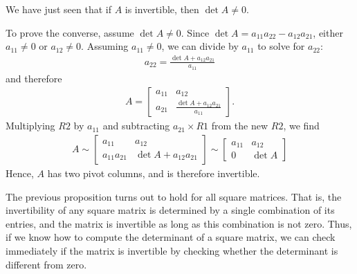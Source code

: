 \documentclass[12pt,letterpaper,reqno]{article}
\numberwithin{equation}{section}
\begin{document}
\begin{pf}
We have just seen that if $A$ is invertible, then $\det A \neq 0$. 

To prove the converse, assume $\det A \neq 0$. Since $\det A=a_{11}a_{22}-a_{12}a_{21}$, either $a_{11} \neq 0$ or $a_{12} \neq 0$. Assuming $a_{11} \neq 0$, we can divide by $a_{11}$ to solve for $a_{22}$:
\begin{align*}
	a_{22}=\frac{\det A+a_{12}a_{21}}{a_{11}}
\end{align*} 
	and therefore
	\begin{align*}
		A=\begin{bmatrix}
			a_{11} & a_{12} \\
			a_{21} & \frac{\det A+a_{12}a_{21}}{a_{11}}
		\end{bmatrix}.
	\end{align*}
Multiplying $R2$ by $a_{11}$ and subtracting $a_{21} \times R1$ from the new $R2$, we find
\begin{align*}
	A \sim \begin{bmatrix}
		a_{11} & a_{12} \\
		a_{11}a_{21} & \det A + a_{12}a_{21}
	\end{bmatrix} \sim \begin{bmatrix}
		a_{11} & a_{12} \\
		0 & \det A
	\end{bmatrix}
\end{align*}
Hence, $A$ has two pivot columns, and is therefore invertible.
\end{pf}

The previous proposition turns out to hold for all square matrices. That is, the invertibility of any square matrix is determined by a single combination of its entries, and the matrix is invertible as long as this combination is not zero. Thus, if we know how to compute the determinant of a square matrix, we can check immediately if the matrix is invertible by checking whether the determinant is different from zero. 
\end{document}
